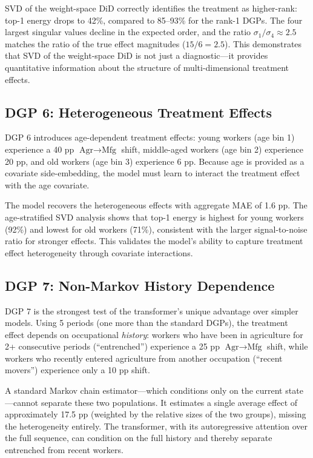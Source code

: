 \documentclass[12pt]{article}
\begin{document}
SVD of the weight-space DiD correctly identifies the treatment as higher-rank: top-1 energy drops to 42\%, compared to 85--93\% for the rank-1 DGPs. The four largest singular values decline in the expected order, and the ratio $\sigma_1 / \sigma_4 \approx 2.5$ matches the ratio of the true effect magnitudes ($15/6 = 2.5$). This demonstrates that SVD of the weight-space DiD is not just a diagnostic---it provides quantitative information about the structure of multi-dimensional treatment effects.

\subsection{DGP 6: Heterogeneous Treatment Effects}

DGP 6 introduces age-dependent treatment effects: young workers (age bin 1) experience a 40 pp $\text{Agr} \to \text{Mfg}$ shift, middle-aged workers (age bin 2) experience 20 pp, and old workers (age bin 3) experience 6 pp. Because age is provided as a covariate side-embedding, the model must learn to interact the treatment effect with the age covariate.

The model recovers the heterogeneous effects with aggregate MAE of 1.6 pp. The age-stratified SVD analysis shows that top-1 energy is highest for young workers (92\%) and lowest for old workers (71\%), consistent with the larger signal-to-noise ratio for stronger effects. This validates the model's ability to capture treatment effect heterogeneity through covariate interactions.

\subsection{DGP 7: Non-Markov History Dependence}

DGP 7 is the strongest test of the transformer's unique advantage over simpler models. Using 5 periods (one more than the standard DGPs), the treatment effect depends on occupational \textit{history}: workers who have been in agriculture for 2+ consecutive periods (``entrenched'') experience a 25 pp $\text{Agr} \to \text{Mfg}$ shift, while workers who recently entered agriculture from another occupation (``recent movers'') experience only a 10 pp shift.

A standard Markov chain estimator---which conditions only on the current state---cannot separate these two populations. It estimates a single average effect of approximately 17.5 pp (weighted by the relative sizes of the two groups), missing the heterogeneity entirely. The transformer, with its autoregressive attention over the full sequence, can condition on the full history and thereby separate entrenched from recent workers.
\end{document}
